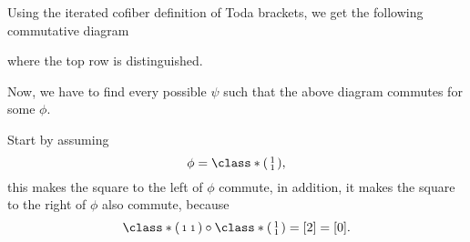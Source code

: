 \begin{example}
	Using the iterated cofiber definition of Toda brackets, we get the following commutative diagram
	\begin{center}
	\end{center}
	where the top row is distinguished.

	Now, we have to find every possible \( \psi \) such that the above diagram commutes for some \( \phi \).

	Start by assuming
	\[ 
		\phi = \class*{
			\begin{psmallmatrix}
				1 \\
				1
			\end{psmallmatrix}
		},
	\]
	this makes the square to the left of \( \phi \) commute, in addition, it makes the square to the right of \( \phi \) also commute, because
	\[
		\class*{\begin{psmallmatrix} 1 & 1 \end{psmallmatrix}} \circ
		\class*{\begin{psmallmatrix}
			1 \\
			1
		\end{psmallmatrix}}
		=
		[2] = [0].
	\]


\end{example}
